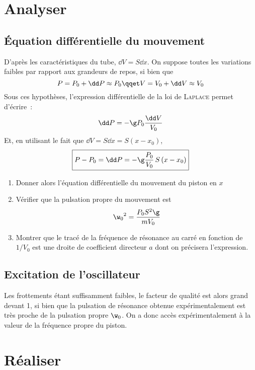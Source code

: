 \documentclass[a4paper, 11pt, final, garamond]{book}
\begin{document}
\section{Analyser}
\subsection{Équation différentielle du mouvement}

D'après les caractéristiques du tube, $\dd V=S \dd x$. On suppose toutes les
variations faibles par rapport aux grandeurs de repos, si bien que
\[
    P = P_0 +\dd P \approx P_0 \qqet V = V_0 +\dd V \approx V_0
\]
Sous ces hypothèses, l'expression différentielle de la loi de \textsc{Laplace}
permet d'écrire~:
\[
    \dd P = -\g P_0 \frac{\dd V}{V_0}
\]
Et, en utilisant le fait que $\dd V = S \dd x = S (x-x_0)$,
\[
    \boxed{P-P_0 = \dd P = - \g \frac{P_0}{V_0} \, S \, (x-x_0)}
\]

\begin{enumerate}[label=\clenumi]
    \item Donner alors l'équation différentielle du mouvement du piston en $x$
    \item Vérifier que la pulsation propre du mouvement est
        \[
            {\w_0}^2 = \frac{P_0S^2\g}{mV_0}
        \]
    \item Montrer que le tracé de la fréquence de résonance au carré en fonction
        de $1/V_0$ est une droite de coefficient directeur $a$ dont on précisera
        l'expression.
\end{enumerate}

\subsection{Excitation de l'oscillateur}

Les frottements étant suffisamment faibles, le facteur de qualité est alors
grand devant 1, si bien que la pulsation de résonance obtenue expérimentalement
est très proche de la pulsation propre $\w_0$. On a donc accès expérimentalement
à la valeur de la fréquence propre du piston.

\section{Réaliser}
\end{document}
